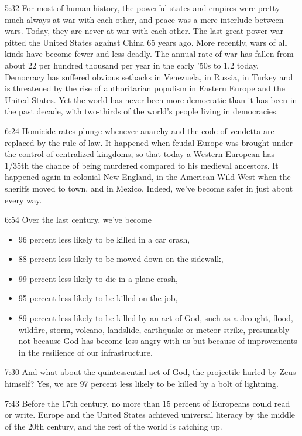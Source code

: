 \documentclass[10pt,titlepage]{book}
\begin{document}
{5:32
For most of human history,
the powerful states and empires
were pretty much always at war with each other,
and peace was a mere interlude between wars.
Today, they are never at war with each other.
The last great power war
pitted the United States against China 65 years ago.
More recently, wars of all kinds have become fewer and less deadly.
The annual rate of war has fallen from about 22 per hundred thousand per year
in the early '50s to 1.2 today.
Democracy has suffered obvious setbacks
in Venezuela, in Russia, in Turkey
and is threatened by the rise of authoritarian populism
in Eastern Europe and the United States.
Yet the world has never been more democratic
than it has been in the past decade,
with two-thirds of the world's people living in democracies.

6:24
Homicide rates plunge whenever anarchy and the code of vendetta
are replaced by the rule of law.
It happened when feudal Europe was brought under the control of centralized kingdoms,
so that today a Western European
has 1/35th the chance of being murdered
compared to his medieval ancestors.
It happened again in colonial New England,
in the American Wild West when the sheriffs moved to town,
and in Mexico.
Indeed, we've become safer in just about every way.

6:54
Over the last century, we've become
\begin{itemize}
\item 96 percent less likely
to be killed in a car crash,
\item 88 percent less likely to be mowed down on the sidewalk,
\item 99 percent less likely to die in a plane crash,
\item 95 percent less likely to be killed on the job,
\item 89 percent less likely to be killed by an act of God,
such as a drought, flood, wildfire, storm, volcano,
landslide, earthquake or meteor strike,
presumably not because God has become less angry with us
but because of improvements in the resilience of our infrastructure.
\end{itemize}

7:30
And what about the quintessential act of God,
the projectile hurled by Zeus himself?
Yes, we are 97 percent less likely to be killed by a bolt of lightning.

7:43
Before the 17th century,
no more than 15 percent of Europeans could read or write.
Europe and the United States achieved universal literacy
by the middle of the 20th century,
and the rest of the world is catching up.

}
\end{document}
